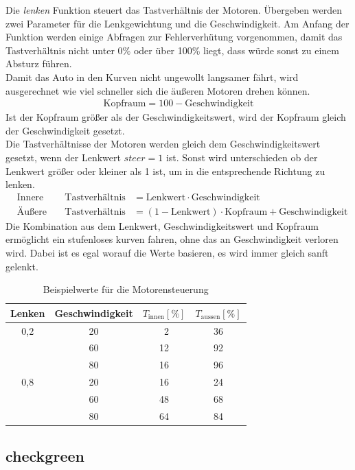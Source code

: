 \documentclass[a4paper, 12pt]{scrartcl}
\begin{document}
Die \textit{lenken} Funktion steuert das Tastverhältnis der Motoren. Übergeben werden zwei Parameter für die Lenkgewichtung und die Geschwindigkeit.
Am Anfang der Funktion werden einige Abfragen zur Fehlerverhütung vorgenommen, damit das Tastverhältnis nicht unter 0\% oder über 100\% liegt, dass würde sonst zu einem Absturz führen.\\
Damit das Auto in den Kurven nicht ungewollt langsamer fährt, wird ausgerechnet wie viel schneller sich die äußeren  Motoren drehen können.
\begin{align}
	\text{Kopfraum} = 100-\text{Geschwindigkeit}
\end{align}
Ist der Kopfraum größer als der Geschwindigkeitswert, wird der Kopfraum gleich der Geschwindigkeit gesetzt.\\

Die Tastverhältnisse der Motoren werden gleich dem Geschwindigkeitswert gesetzt, wenn der Lenkwert $steer=1$ ist. Sonst wird unterschieden ob der Lenkwert größer oder kleiner als 1 ist, um in die entsprechende Richtung zu lenken.
\begin{align}
	&\text{Innere Motoren:} &\text{Tastverhältnis} &= \text{Lenkwert}\cdot\text{Geschwindigkeit}\\
	&\text{Äußere Motoren:} &\text{Tastverhältnis} &= (1-\text{Lenkwert})\cdot\text{Kopfraum}+\text{Geschwindigkeit}
\end{align}
Die Kombination aus dem Lenkwert, Geschwindigkeitswert und Kopfraum ermöglicht ein stufenloses kurven fahren, ohne das an Geschwindigkeit verloren wird. Dabei ist es egal worauf die Werte basieren, es wird immer gleich sanft gelenkt.

\begin{table}[th!]
	\centering
	\caption{Beispielwerte für die Motorensteuerung}
	\begin{tabular}{c|c|c|c}
		Lenken & Geschwindigkeit & $T_{\text{innen}} [\%]$ &  $T_{\text{aussen}}[\%]$ \\ \hline 
		0,2 & 20 & \ 2 & 36 \\  
		    & 60 & 12  & 92 \\    
		    & 80 & 16  & 96 \\ \hline
		0,8 & 20 & 16  & 24 \\
		    & 60 & 48  & 68 \\
		    & 80 & 64  & 84 \\
	\end{tabular} 
\end{table}

\subsection{checkgreen}	%

\end{document}
